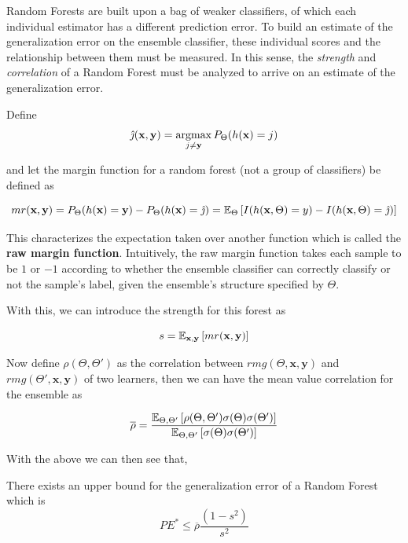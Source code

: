 Random Forests are built upon a bag of weaker classifiers, of which each individual estimator has a different prediction error.
To build an estimate of the generalization error on the ensemble classifier, these individual scores and the relationship between them must be measured.
In this sense, the \textit{strength} and \textit{correlation} of a Random Forest must be analyzed to arrive on an estimate of the generalization error.

Define $$\hat{\jmath}( \textbf{x},\textbf{y}) = \operatorname*{argmax}_{j \neq \textbf{y}} P_{\Theta}(h(\textbf{x}) = j)$$

and let the margin function for a random forest (not a group of classifiers) be defined as

\[
mr(\textbf{x},\textbf{y}) = P_{\Theta}(h(\textbf{x}) = \textbf{y}) - P_{\Theta}(h(\textbf{x}) = \hat{\jmath})
\\
= \operatorname{\mathbb{E}}_{\Theta} \left[ I(h(\textbf{x},\Theta ) = y ) - I( h( \textbf{x},\Theta ) = \hat{\jmath} ) \right]
\]

This characterizes the expectation taken over another function which is called the \textbf{raw margin function}.
Intuitively, the raw margin function takes each sample to be $1$ or $-1$ according to whether the ensemble classifier can correctly classify or not the sample's label, given the ensemble's structure specified by $\Theta$.

With this, we can introduce the strength for this forest as

\begin{equation}
s = \operatorname{\mathbb{E}}_{\textbf{x},\textbf{y}} \left[ mr(\textbf{x},\textbf{y} ) \right]
\end{equation}

Now define $ \rho(\Theta, \Theta')$ as the correlation between $rmg(\Theta,\textbf{x},\textbf{y})$ and $rmg(\Theta',\textbf{x},\textbf{y})$ of two learners, then we can have the mean value correlation for the ensemble as

\begin{equation}
\overline{\rho} = \frac{\operatorname{\mathbb{E}}_{\Theta, \Theta'} \left[ \rho(\Theta, \Theta') \sigma(\Theta) \sigma(\Theta')\right]}
{\operatorname{\mathbb{E}}_{\Theta, \Theta'} \left[ \sigma(\Theta) \sigma(\Theta')\right]}
\end{equation}

With the above we can then see that,

\begin{theorem}
There exists an upper bound for the generalization error of a Random Forest which is    \begin{equation}
PE^* \leq \overline{\rho}\frac{(1-s^2)}{s^2}
\end{equation}
\end{theorem}

